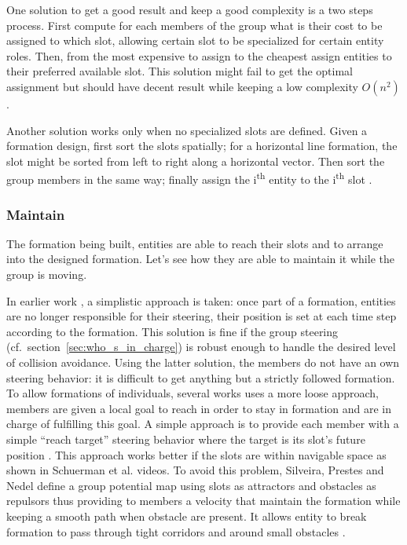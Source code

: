 \documentclass[a4paper,titlepage]{article}
\begin{document}
One solution to get a good result and keep a good complexity is a two steps process. First compute for each members of the group what is their cost to be assigned to which slot, allowing certain slot to be specialized for certain entity roles. Then, from the most expensive to assign to the cheapest assign entities to their preferred available slot. This solution might fail to get the optimal assignment but should have decent result while keeping a low complexity $O(n^2)$
\cite{Millington:2006wz}.

Another solution works only when no specialized slots are defined. Given a formation design, first sort the slots spatially; for a horizontal line formation, the slot might be sorted from left to right along a horizontal vector. Then sort the group members in the same way; finally assign the i\textsuperscript{th} entity to the i\textsuperscript{th} slot \cite{Dawson:2002vd}.

\subsubsection{Maintain}

The formation being built, entities are able to reach their slots and to arrange into the designed formation. Let’s see how they are able to maintain it while the group is moving.

In earlier work \cite{Pottinger:1999vk}, a simplistic approach is taken: once part of a formation, entities are no longer responsible for their steering, their position is set at each time step according to the formation. This solution is fine if the group steering (cf.\ section~\ref{sec:who_s_in_charge}) is robust enough to handle the desired level of collision avoidance.
Using the latter solution, the members do not have an own steering behavior: it is difficult to get anything but a strictly followed formation. To allow formations of individuals, several works uses a more loose approach, members are given a local goal to reach in order to stay in formation and are in charge of fulfilling this goal. A simple approach is to provide each member with a simple “reach target” steering behavior where the target is its slot’s future position \cite{Karamouzas:2010fi,Schuerman:2010um}. This approach works better if the slots are within navigable space as shown in Schuerman et al. videos. To avoid this problem, Silveira, Prestes and Nedel define a group potential map using slots as attractors and obstacles as repulsors thus providing to members a velocity that maintain the formation while keeping a smooth path when obstacle are present. It allows entity to break formation to pass through tight corridors and around small obstacles \cite{Silveira:2008bc}.
\end{document}
